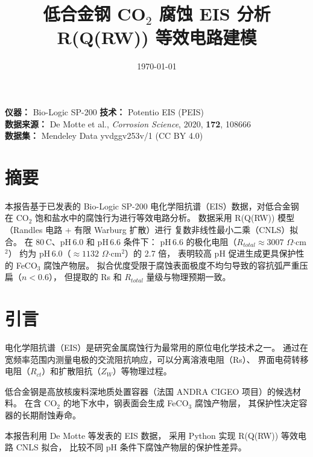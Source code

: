 \documentclass[12pt,a4paper]{ctexart}
\title{\textbf{低合金钢 CO$_2$ 腐蚀 EIS 分析}\\\small R(Q(RW)) 等效电路建模}
\author{}
\date{\today}
\begin{document}
\maketitle\thispagestyle{empty}

\begin{center}\small
\textbf{仪器：} Bio-Logic SP-200 \quad\textbf{技术：} Potentio EIS (PEIS)\\
\textbf{数据来源：} De Motte et al., \textit{Corrosion Science}, 2020, \textbf{172}, 108666\\
\textbf{数据集：} Mendeley Data yvdggv253v/1 (CC BY 4.0)
\end{center}
\vspace{1cm}
\tableofcontents\newpage

\section{摘要}

本报告基于已发表的 Bio-Logic SP-200 电化学阻抗谱（EIS）数据，对低合金钢
在 CO$_2$ 饱和盐水中的腐蚀行为进行等效电路分析。
数据采用 R(Q(RW)) 模型（Randles 电路 + 有限 Warburg 扩散）进行
复数非线性最小二乘（CNLS）拟合。
在 80\,\textdegree C、pH\,6.0 和 pH\,6.6 条件下：
pH\,6.6 的极化电阻（$R_{total} \approx 3007$ $\Omega$$\cdot$cm$^2$）
约为 pH\,6.0（$\approx 1132$ $\Omega$$\cdot$cm$^2$）的 2.7 倍，
表明较高 pH 促进生成更具保护性的 FeCO$_3$ 腐蚀产物层。
拟合优度受限于腐蚀表面极度不均匀导致的容抗弧严重压扁（$n < 0.6$），
但提取的 Rs 和 $R_{total}$ 量级与物理预期一致。

\newpage

\section{引言}

电化学阻抗谱（EIS）是研究金属腐蚀行为最常用的原位电化学技术之一。
通过在宽频率范围内测量电极的交流阻抗响应，可以分离溶液电阻（Rs）、
界面电荷转移电阻（$R_{ct}$）和扩散阻抗（$Z_W$）等物理过程\cite{orazem2008}。

低合金钢是高放核废料深地质处置容器（法国 ANDRA CIGEO 项目）的候选材料。
在含 CO$_2$ 的地下水中，钢表面会生成 FeCO$_3$ 腐蚀产物层，
其保护性决定容器的长期耐蚀寿命\cite{demotte2020}。

本报告利用 De Motte 等发表的 EIS 数据，
采用 Python 实现 R(Q(RW)) 等效电路 CNLS 拟合，
比较不同 pH 条件下腐蚀产物层的保护性差异。
\end{document}
